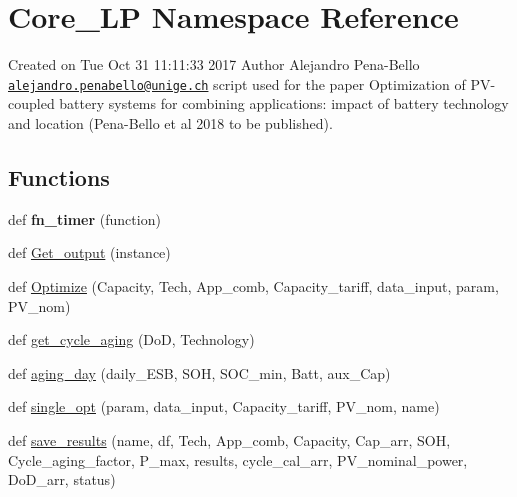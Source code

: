 \hypertarget{namespace_core___l_p}{}\section{Core\+\_\+\+LP Namespace Reference}
\label{namespace_core___l_p}


Created on Tue Oct 31 11\+:11\+:33 2017 Author Alejandro Pena-\/\+Bello \href{mailto:alejandro.penabello@unige.ch}{\tt alejandro.\+penabello@unige.\+ch} script used for the paper Optimization of P\+V-\/coupled battery systems for combining applications\+: impact of battery technology and location (Pena-\/\+Bello et al 2018 to be published).  


\subsection*{Functions}
\begin{DoxyCompactItemize}
\item 
\mbox{\label{namespace_core___l_p_addd3013e86c01fb4e5f2e614a63fb88f}} 
def {\bfseries fn\+\_\+timer} (function)
\item 
def \mbox{\hyperlink{namespace_core___l_p_a6d35392ffd5384b704752a0442ad2332}{Get\+\_\+output}} (instance)
\item 
def \mbox{\hyperlink{namespace_core___l_p_ae8eea760613de77c4254a1ab54c8ea19}{Optimize}} (Capacity, Tech, App\+\_\+comb, Capacity\+\_\+tariff, data\+\_\+input, param, P\+V\+\_\+nom)
\item 
def \mbox{\hyperlink{namespace_core___l_p_a90d03e131848066a67ee156ba403f3c2}{get\+\_\+cycle\+\_\+aging}} (DoD, Technology)
\item 
def \mbox{\hyperlink{namespace_core___l_p_ae2add554ee7eb6419d9ec5e4fa2c7b96}{aging\+\_\+day}} (daily\+\_\+\+E\+SB, S\+OH, S\+O\+C\+\_\+min, Batt, aux\+\_\+\+Cap)
\item 
def \mbox{\hyperlink{namespace_core___l_p_ab1040dbb52cf80c84f076e2cec1c43c5}{single\+\_\+opt}} (param, data\+\_\+input, Capacity\+\_\+tariff, P\+V\+\_\+nom, name)
\item 
def \mbox{\hyperlink{namespace_core___l_p_ad3ce270c3724a0bcc673151adc50ea9b}{save\+\_\+results}} (name, df, Tech, App\+\_\+comb, Capacity, Cap\+\_\+arr, S\+OH, Cycle\+\_\+aging\+\_\+factor, P\+\_\+max, results, cycle\+\_\+cal\+\_\+arr, P\+V\+\_\+nominal\+\_\+power, Do\+D\+\_\+arr, status)
\end{DoxyCompactItemize}



